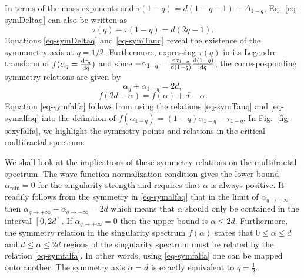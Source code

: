 In terms of the mass exponents and $\tau(1-q)=d(1-q-1)+\Delta_{1-q}$, Eq.~\eqref{eq-symDeltaq} can also be written as
%
\begin{equation}
\label{eq-symTauq}
 \tau(q)-\tau(1-q)=d(2q-1).
\end{equation}
%
Equations \eqref{eq-symDeltaq} and \eqref{eq-symTauq} reveal the existence of the symmmetry axis at $q=1/2$.
Furthermore, expressing $\tau(q)$ in its Legendre transform of $f(\alpha_q=\frac{\mathrm{d}\tau_q}{\mathrm{d} q})$ and since $-\alpha_{1-q}=\frac{\mathrm{d}\tau_{1-q}}{\mathrm{d} (1-q)}\frac{\mathrm{d} (1-q)}{\mathrm{d} q}$, the corresposponding symmetry relations are given by
%
\begin{equation}
 	\alpha_q + \alpha_{1-q} = 2d,
	\label{eq-symalfaq}
\end{equation}
%
\begin{equation}
 	f(2d-\alpha) = f(\alpha) +d -\alpha.
	\label{eq-symfalfa}
\end{equation}
%
Equation \eqref{eq-symfalfa} follows from using the relations \eqref{eq-symTauq} and \eqref{eq-symalfaq} into the definition of $f(\alpha_{1-q})=(1-q)\alpha_{1-q}-\tau_{1-q}$.  In Fig.~\ref{fig-sexyfalfa}, we highlight the symmetry points and relations in the critical multifractal spectrum.


We shall look at the implications of these symmetry relations on the multifractal spectrum.
%
%
%
%
The wave function normalization condition gives the lower bound $\alpha_{\mathrm{min}}=0$ for the singularity strength and requires that $\alpha$ is always positive.
It readily follows from the symmetry in \eqref{eq-symalfaq} that in the limit of $\alpha_{q\rightarrow+\infty}$ then $\alpha_{q\rightarrow+\infty}+\alpha_{q\rightarrow-\infty}=2d$ which means that $\alpha$ should only be contained in the interval $[0,2d]$.  If $\alpha_{q\rightarrow+\infty}=0$ then the upper bound is $\alpha\leqslant 2d$.
%
Furthermore, the symmetry relation in the singularity spectrum $f(\alpha)$ states that $0\leqslant \alpha \leqslant d$ and $d\leqslant \alpha \leqslant
2d$ regions of the singularity spectrum must be related by the relation \eqref{eq-symfalfa}.  In other words, using \eqref{eq-symfalfa} one can be mapped onto another.  The symmetry axis $\alpha=d$ is exactly equivalent to $q=\frac{1}{2}$.


